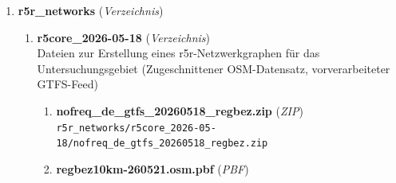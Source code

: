 \begin{enumerate}[label=\arabic*., leftmargin=*, itemsep=0.5em, topsep=0.3em]
\begin{enumerate}[label=\arabic{enumi}.\arabic*, leftmargin=*, itemsep=0.5em, topsep=0.3em]
Bedienungsqualitäten der Haltestellen auf Grundlage der stündlichen Abfahrten pro Stunde (Output von 04\_stop\_frequencies\_de\_gtfs, Grundlage für 11\_i2\_analysis und EQ-Werte)\\
\texttt{\small output\_examples/hourly\_20260518\_weekday\_2026-05-04\_2026-06-26\_.fst}
\item \textbf{hourmean\_20260518\_weekday\_2026-05-04\_2026-06-26\_.fst} \textnormal{(\textit{FST})}\\
Bedienungsqualitäten der Haltestellen auf Grundlage des stündlichen Mittels der Abfahrten pro Stunde (Output von mean\_frequencies)\\
\texttt{\small output\_examples/hourmean\_20260518\_weekday\_2026-05-04\_2026-06-26\_.fst}
\item \textbf{totalmean\_20260518\_weekday\_2026-05-04\_2026-06-26\_.fst} \textnormal{(\textit{FST})}\\
Bedienungsqualitäten der Haltestellen auf Grundlage des Mittels der Abfahrten pro Stunde über den gesamten Zeitraum (Output von mean\_frequencies)\\
\texttt{\small output\_examples/totalmean\_20260518\_weekday\_2026-05-04\_2026-06-26\_.fst}
\item \textbf{walk\_20min\_zensus\_stops.csv} \textnormal{(\textit{CSV})}\\
Fußweg-Reisezeitmatrix zu Haltestellen (Output von 10\_i2\_traveltimes)\\
\texttt{\small output\_examples/walk\_20min\_zensus\_stops.csv}
\end{enumerate}
\item \textbf{r5r\_networks} \textnormal{(\textit{Verzeichnis})}
\begin{enumerate}[label=\arabic{enumi}.\arabic*, leftmargin=*, itemsep=0.5em, topsep=0.3em]
\item \textbf{r5core\_2026-05-18} \textnormal{(\textit{Verzeichnis})}\\
Dateien zur Erstellung eines r5r-Netzwerkgraphen für das Untersuchungsgebiet (Zugeschnittener OSM-Datensatz, vorverarbeiteter GTFS-Feed)
\begin{enumerate}[label=\arabic{enumi}.\arabic{enumii}.\arabic*, leftmargin=*, itemsep=0.5em, topsep=0.3em]
\item \textbf{nofreq\_de\_gtfs\_20260518\_regbez.zip} \textnormal{(\textit{ZIP})}\\
\texttt{\small r5r\_networks/r5core\_2026-05-18/nofreq\_de\_gtfs\_20260518\_regbez.zip}
\item \textbf{regbez10km-260521.osm.pbf} \textnormal{(\textit{PBF})}\\

\end{enumerate}
\end{enumerate}
\end{enumerate}
